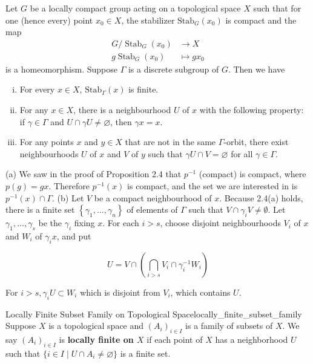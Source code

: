 \documentclass{report}
\begin{document}
\begin{proposition}{}{}
	Let $G$ be a locally compact group acting on a topological space $X$ such that for one (hence every) point $x_0 \in X$, the stabilizer $\mathrm{Stab}_G(x_0)$ is compact and the map
	$$
		\begin{aligned}
			G / \operatorname{Stab}_G(x_0) & \longrightarrow X \\
			g\operatorname{Stab}_G(x_0)    & \longmapsto g x_0
		\end{aligned}
	$$
	 is a homeomorphism. Suppose $\Gamma$ is a discrete subgroup of $G$. Then we have
	\begin{enumerate}[(i)]
		\item For every $x \in X$, $\mathrm{Stab}_\Gamma(x)$ is finite.
		\item For any $x \in X$, there is a neighbourhood $U$ of $x$ with the following property: if $\gamma \in \Gamma$ and $U \cap \gamma U \neq \varnothing$, then $\gamma x=x$.
		\item For any points $x$ and $y \in X$ that are not in the same $\Gamma$-orbit, there exist neighbourhoods $U$ of $x$ and $V$ of $y$ such that $\gamma U \cap V=\varnothing$ for all $\gamma \in \Gamma$.
	\end{enumerate}
\end{proposition}
\begin{prf}
 (a) We saw in the proof of Proposition 2.4 that $p^{-1}$ (compact) is compact, where $p(g)=g x$. Therefore $p^{-1}(x)$ is compact, and the set we are interested in is $p^{-1}(x) \cap \Gamma$.
(b) Let $V$ be a compact neighbourhood of $x$. Because 2.4(a) holds, there is a finite set $\left\{\gamma_1, \ldots, \gamma_n\right\}$ of elements of $\Gamma$ such that $V \cap \gamma_i V \neq \emptyset$. Let $\gamma_1, \ldots, \gamma_s$ be the $\gamma_i$ fixing $x$. For each $i>s$, choose disjoint neighbourhoods $V_i$ of $x$ and $W_i$ of $\gamma_i x$, and put

$$
U=V \cap\left(\bigcap_{i>s} V_i \cap \gamma_i^{-1} W_i\right)
$$


For $i>s, \gamma_i U \subset W_i$ which is disjoint from $V_i$, which contains $U$.
\end{prf}

\begin{definition}{Locally Finite Subset Family on Topological Space}{locally_finite_subset_family}
	Suppose $X$ is a topological space and $(A_i)_{i\in I}$ is a family of subsets of $X$. We say $(A_i)_{i\in I}$ is \textbf{locally finite on $X$} if each point of $X$ has a neighborhood $U$ such that $\{i\in I\mid U\cap A_i\ne \varnothing\}$ is a finite set.
\end{definition}
\end{document}
